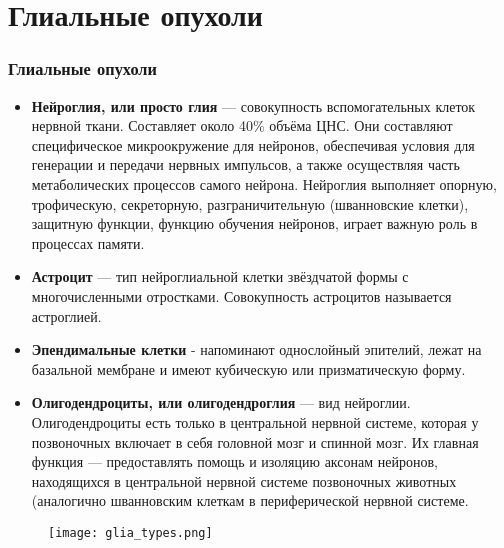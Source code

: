 
\section{Глиальные опухоли}

\begin{frame}
  \frametitle{Глиальные опухоли}

  \begin{itemize}
  \item \textbf{Нейроглия, или просто глия}  — совокупность вспомогательных клеток нервной ткани. 
  Составляет около 40\% объёма ЦНС.  Они составляют специфическое микроокружение для нейронов, 
  обеспечивая условия для генерации и передачи нервных импульсов, а также осуществляя часть 
  метаболических процессов самого нейрона.
  Нейроглия выполняет опорную, трофическую, секреторную, разграничительную (шванновские клетки),
  защитную функции, функцию обучения нейронов, играет важную роль в процессах памяти.
  
  \item \textbf{Астроцит}  — тип нейроглиальной 
  клетки звёздчатой формы с многочисленными отростками. Совокупность астроцитов называется астроглией.
  \item \textbf{Эпендимальные клетки} - напоминают однослойный эпителий, лежат на базальной мембране и 
  имеют кубическую или призматическую форму.
  \item\textbf{Олигодендроциты, или олигодендроглия} — вид нейроглии. Олигодендроциты есть только в центральной нервной системе, 
  которая у позвоночных включает в себя головной мозг и спинной мозг. Их главная функция — 
  предоставлять помощь и изоляцию аксонам нейронов, находящихся в центральной нервной системе позвоночных животных (аналогично шванновским клеткам в периферической нервной системе.
  
  
 \end{itemize}
\begin{figure}
  \texttt{[image: glia\_types.png]}
\end{figure}
\end{frame}

